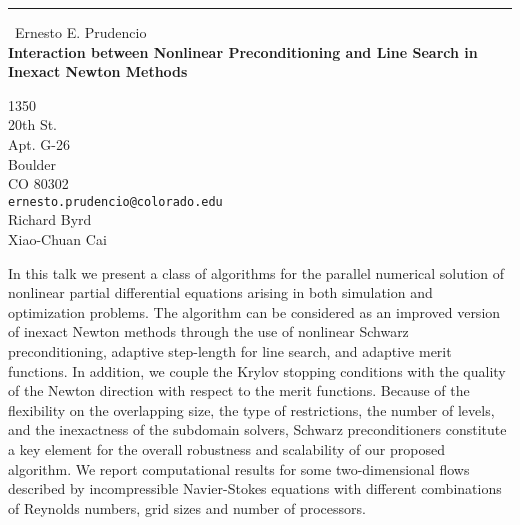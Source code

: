 \documentclass{report}
\begin{document}
\begin{center}
\rule{6in}{1pt} \
{\large Ernesto E. Prudencio \\
{\bf Interaction between Nonlinear Preconditioning and Line Search in Inexact Newton Methods}}

1350 \\ 20th St. \\ Apt. G-26 \\ Boulder \\ CO 80302
\\
{\tt ernesto.prudencio@colorado.edu}\\
Richard Byrd\\
Xiao-Chuan Cai\end{center}

In this talk we present
a class of algorithms
for the parallel numerical solution of nonlinear partial differential
equations arising in both simulation
and optimization problems.
The algorithm can be considered as an improved version of inexact Newton methods through
the use of nonlinear Schwarz preconditioning, adaptive step-length for
line search, and adaptive merit functions.
In addition,
we couple
the Krylov stopping conditions with the quality of the Newton direction
with respect to the merit functions.
Because of the flexibility on the overlapping size, the type of
restrictions, the number of levels,
and the inexactness of the subdomain solvers, Schwarz preconditioners constitute a key
element for the overall robustness and scalability of our proposed algorithm.
We report computational results for some two-dimensional flows described
by incompressible Navier-Stokes equations with
different combinations of Reynolds numbers, grid sizes and number of processors.
\end{document}
